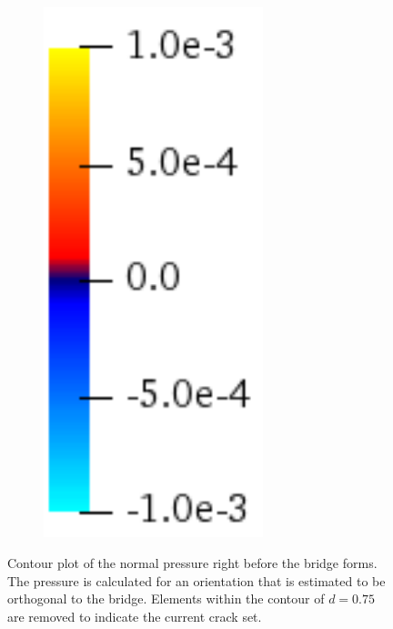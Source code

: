 \begin{figure}[htb!]
\begin{subfigure}[b]{0.15\textwidth}
    \includegraphics[width=0.7\textwidth]{Chapter4/figures/coldhot_pressure.png}
    \vspace{0.1in}
  \end{subfigure}
  \caption{Contour plot of the normal pressure right before the bridge forms. The pressure is calculated for an orientation that is estimated to be orthogonal to the bridge. Elements within the contour of $d = 0.75$ are removed to indicate the current crack set. }
  \label{fig: Chapter4/biaxial_nosplit_stress}
\end{figure}
